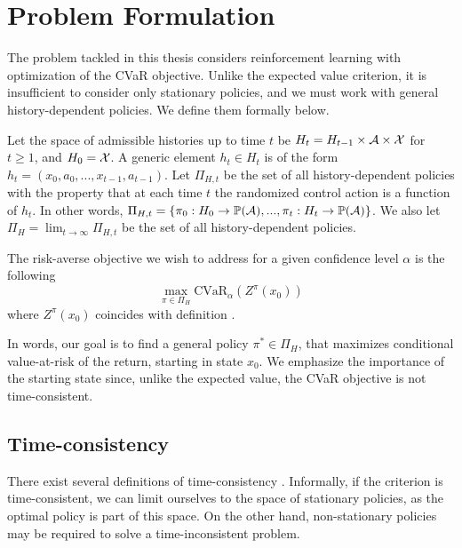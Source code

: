 
\section{Problem Formulation}\label{sec:prelim:problem}

The problem tackled in this thesis considers reinforcement learning with optimization of the CVaR objective. Unlike the expected value criterion, it is insufficient to consider only stationary policies, and we must work with general history-dependent policies. We define them formally below.

\begin{definition}
Let the space of admissible histories up to time $t$ be $H_t = H_{t-1} \times \mathcal{A} \times \mathcal{X}$ for $t \ge 1$, and $H_0 = \mathcal{X}$. A generic element $h_t \in H_t$ is of the form $h_t = (x_0, a_0, ..., x_{t-1}, a_{t-1})$. Let $\Pi_{H,t}$ be the set of all history-dependent policies with the property that at each time $t$ the randomized control action is a function of $h_t$. In other words, 
$\Pi_{H,t} = \left\{ {\pi_0: H_0 \to \mathbb{P}(\mathcal{A}), ..., \pi_t: H_t \to \mathbb{P}(\mathcal{A})} \right\}$. We also let $\Pi_H = \lim_{t\to\infty}\Pi_{H,t}$ be the set of all history-dependent policies.
\end{definition}

The risk-averse objective we wish to address for a given confidence level $\alpha$ is the following
\begin{equation}\label{eqn:problem}
\max_{\pi \in \Pi_H} \text{CVaR}_\alpha(Z^\pi(x_0))
\end{equation}
where $Z^\pi(x_0)$ coincides with definition .

In words, our goal is to find a general policy $\pi^*\in \Pi_H$, that maximizes conditional value-at-risk of the return, starting in state $x_0$. We emphasize the importance of the starting state since, unlike the expected value, the CVaR objective is not time-consistent.


\subsection{Time-consistency}\label{sec:time}

There exist several definitions of time-consistency \citep{pflug2016time, boda2006time}.
Informally, if the criterion is time-consistent, we can limit ourselves to the space of stationary policies, as the optimal policy is part of this space. On the other hand, non-stationary policies may be required to solve a time-inconsistent problem.

